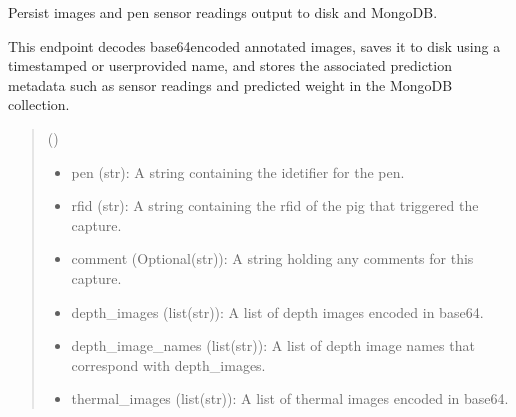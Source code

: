 \documentclass[letterpaper,10pt,english]{sphinxmanual}
\begin{document}
\begin{fulllineitems}
\label{\detokenize{modules/src.pig_sorting_api.main:src.pig_sorting_api.main.save_swine_data}}
\pysigstartsignatures
\pysiglinewithargsret
{}
{}
{}
\pysigstopsignatures
\sphinxAtStartPar
Persist images and pen sensor readings output to disk and MongoDB.

\sphinxAtStartPar
This endpoint decodes base64\sphinxhyphen{}encoded annotated images, saves it to
disk using a timestamped or user\sphinxhyphen{}provided name, and stores the
associated prediction metadata such as sensor readings and predicted weight in the MongoDB 
collection.
\begin{quote}\begin{description}
\sphinxAtStartPar
{} ({\hyperref[\detokenize{modules/src.pig_sorting_api.main:src.pig_sorting_api.main.SwineDataSave}]{}}) \textendash{} \begin{itemize}
\item {} 
\sphinxAtStartPar
pen (str): A string containing the idetifier for the pen.

\item {} 
\sphinxAtStartPar
rfid (str): A string containing the rfid of the pig that triggered the capture.

\item {} 
\sphinxAtStartPar
comment (Optional(str)): A string holding any comments for this capture.

\item {} 
\sphinxAtStartPar
depth\_images (list(str)): A list of depth images encoded in base64.

\item {} 
\sphinxAtStartPar
depth\_image\_names (list(str)): A list of depth image names that correspond with depth\_images.

\item {} 
\sphinxAtStartPar
thermal\_images (list(str)): A list of thermal images encoded in base64.


\end{itemize}
\end{description}
\end{quote}
\end{fulllineitems}
\end{document}
